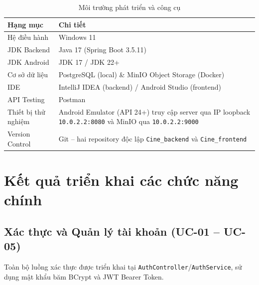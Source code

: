 \begin{table}[H]
\centering
\caption{Môi trường phát triển và công cụ}
\label{tab:dev_env}
\renewcommand{\arraystretch}{1.3}
\begin{tabularx}{\textwidth}{|l|X|}
\hline
\textbf{Hạng mục} & \textbf{Chi tiết} \\
\hline
Hệ điều hành & Windows 11 \\
\hline
JDK Backend & Java 17 (Spring Boot 3.5.11) \\
\hline
JDK Android & JDK 17 / JDK 22+ \\
\hline
Cơ sở dữ liệu & PostgreSQL (local) \& MinIO Object Storage (Docker) \\
\hline
IDE & IntelliJ IDEA (backend) / Android Studio (frontend) \\
\hline
API Testing & Postman \\
\hline
Thiết bị thử nghiệm & Android Emulator (API 24+) truy cập server qua IP loopback \texttt{10.0.2.2:8080} và MinIO qua \texttt{10.0.2.2:9000} \\
\hline
Version Control & Git -- hai repository độc lập \texttt{Cine\_backend} và \texttt{Cine\_frontend} \\
\hline
\end{tabularx}
\end{table}


\section{Kết quả triển khai các chức năng chính}
\label{sec:ket_qua_trien_khai}

\subsection{Xác thực và Quản lý tài khoản (UC-01 -- UC-05)}
\label{subsec:tk_xac_thuc}

Toàn bộ luồng xác thực được triển khai tại \texttt{AuthController}/\texttt{AuthService}, sử dụng mật khẩu băm BCrypt và JWT Bearer Token.

